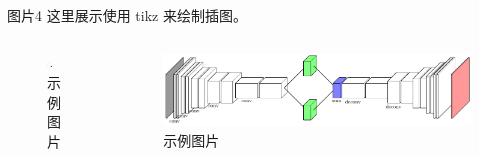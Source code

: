\documentclass[aspectratio=169]{beamer}
\begin{document}
\begin{frame}{图片4}
    这里展示使用 tikz 来绘制插图。\\
    \begin{columns}[t]  %
        \begin{column}{0.3\textwidth}
            \begin{figure}[!ht]
                \centering
                \includegraphics[width=0.4\textwidth]{tikz/pic1/pic.pdf}
                \caption{示例图片}
                \label{fig:pic1}
            \end{figure}
        \end{column}
        \begin{column}{0.7\textwidth}
            \begin{figure}[!ht]
                \centering
                \includegraphics[width=\textwidth]{tikz/net/pic.pdf}
                \caption{示例图片}
                \label{fig:net}
            \end{figure}
        \end{column}
    \end{columns}
\end{frame}
\end{document}

